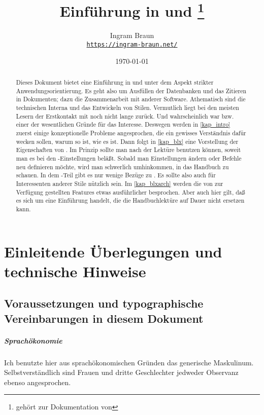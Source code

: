 \documentclass[
	11pt,        %
	table,       %
	twoside,     %
	notitlepage, %
]{scrreprt}
\title{Einführung in \blx{} und \archbib\thanks{gehört zur Dokumentation von \archbib{~v.2.3.0}}}
\author{Ingram Braun\\\href{https://ingram-braun.net/}{\texttt{https://ingram-braun.net/}}}
\date{\today}
\newcommand{\IfTeXforHt}[2]{\ifdefined\HCode#1\else#2\fi} %
\begin{document}
\IfTeXforHt{}{\maketitle}

\begin{abstract}
Dieses Dokument bietet eine Einführung in \blx{} und \archbib{} unter dem Aspekt strikter Anwendungsorientierung. Es geht also um Ausfüllen der
Datenbanken und das Zitieren in Dokumenten; dazu die Zusammenarbeit mit anderer Software. Athematisch sind die technischen Interna und das Entwickeln von Stilen.
Vermutlich liegt bei den meisten Lesern der Erstkontakt mit \LaTeXi{} noch nicht lange zurück. Und wahrscheinlich war \blx{} bzw. \archbib{} einer der wesentlichen Gründe für das Interesse. Deswegen werden in \cref{kap_intro} zuerst einige konzeptionelle Probleme angesprochen, die ein gewisses Verständnis dafür wecken sollen, warum \blx{} so ist, wie es ist. Dann folgt in \cref{kap_blx} eine Vorstellung der Eigenschaften von \blx. Im Prinzip sollte man nach der Lektüre \blx{} benutzen können, soweit man es bei den -Einstellungen beläßt. Sobald man Einstellungen ändern oder Befehle neu definieren möchte, wird man schwerlich umhinkommen, in das Handbuch zu schauen. In dem \blx-Teil gibt es nur wenige Bezüge zu \archbib. Es sollte also auch für Interessenten anderer Stile nützlich sein. Im \cref{kap_blxarch} werden die von \archbib{} zur Verfügung gestellten Features etwas ausführlicher besprochen. Aber auch hier gilt, daß es sich um eine Einführung handelt, die die Handbuchlektüre auf Dauer nicht ersetzen kann.
\end{abstract}
 
\tableofcontents

\chapter{Einleitende Überlegungen und technische Hinweise}\label{kap_intro}

\section{Voraussetzungen und typographische Vereinbarungen in diesem Dokument}

\paragraph{Sprachökonomie} Ich benutzte hier aus sprachökonomischen Gründen das generische Maskulinum. Selbstverständlich sind Frauen und dritte Geschlechter jedweder Observanz ebenso angesprochen.
\end{document}
